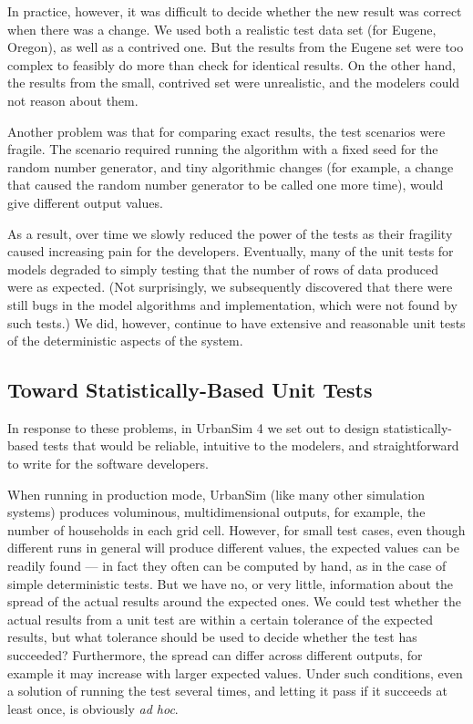 \documentclass{sig-alternate}
\begin{document}
In practice, however, it was difficult to decide whether the new result was
correct when there was a change.  We used both a realistic test data set
(for Eugene, Oregon), as well as a contrived one.  But the results from the
Eugene set were too complex to feasibly do more than check for identical
results.  On the other hand, the results from the small, contrived set were
unrealistic, and the modelers could not reason about them.

Another problem was that for comparing exact results, the test scenarios were
fragile.  The scenario required running the algorithm with a fixed seed for the
random number generator, and tiny algorithmic changes (for example, a change
that caused the random number generator to be called one more time), would give
different output values.

As a result, over time we slowly reduced the power of the
tests as their fragility caused increasing pain for the developers.
Eventually, many of the unit tests for models
degraded to simply testing that the
number of rows of data produced were as expected.  (Not surprisingly, we
subsequently discovered that there were still bugs in the model algorithms
and implementation, which were not found by such tests.)  We did, however, continue to
have extensive and reasonable unit tests of the deterministic aspects of
the system.

\subsection{Toward Statistically-Based Unit Tests}

In response to these problems, in UrbanSim 4 we set out to
design statistically-based tests that would be reliable, intuitive to the
modelers, and straightforward to write for the software developers.

When running in production mode, UrbanSim (like many other simulation
systems) produces voluminous, multidimensional outputs, for example, the
number of households in each grid cell.  However, for small test cases,
even though different runs in general will produce different values, the
expected values can be readily found --- in fact they often can be computed
by hand, as in the case of simple deterministic tests.
But we have no, or very little, information about the spread of the
actual results around the expected ones.  We could test whether the actual
results from a unit test are within a certain tolerance of the expected
results, but what tolerance should be used to decide whether the test has
succeeded?  Furthermore, the spread can differ across different outputs,
for example it may increase with larger expected values. Under such
conditions, even a solution of running the test several times, and letting
it pass if it succeeds at least once, is obviously \emph{ad hoc}.
\end{document}
